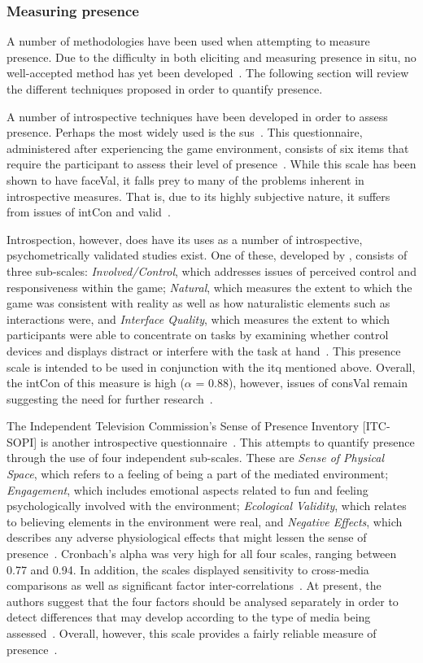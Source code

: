 \subsubsection{Measuring presence}
A number of methodologies have been used when attempting to measure presence. Due to the difficulty in both eliciting and measuring presence in situ, no well-accepted method has yet been developed~\citep{Mand06}. The following section will review the different techniques proposed in order to quantify presence.

A number of introspective techniques have been developed in order to assess presence. Perhaps the most widely used is the \gls{sus}~\citep{Blak10}. This questionnaire, administered after experiencing the game environment, consists of six items that require the participant to assess their level of presence~\citep{Ivor07}. While this scale has been shown to have \gls{faceVal}, it falls prey to many of the problems inherent in introspective measures. That is, due to its highly subjective nature, it suffers from issues of \gls{intCon} and \gls{valid}~\citep{Blak10}.

Introspection, however, does have its uses as a number of introspective, psychometrically validated studies exist. One of these, developed by \citet{Witm98}, consists of three sub-scales: \textit{Involved/Control}, which addresses issues of perceived control and responsiveness within the game; \textit{Natural}, which measures the extent to which the game was consistent with reality as well as how naturalistic elements such as interactions were, and \textit{Interface Quality}, which measures the extent to which participants were able to concentrate on tasks by examining whether control devices and displays distract or interfere with the task at hand~\citep{Witm98}. This presence scale is intended to be used in conjunction with the \gls{itq} mentioned above. Overall, the \gls{intCon} of this measure is high ($\alpha$ = 0.88), however, issues of \gls{consVal} remain suggesting the need for further research~\citep{Witm98}.

The Independent Television Commission's Sense of Presence Inventory [ITC-SOPI] is another introspective questionnaire~\citep{Blak10}. This attempts to quantify presence through the use of four independent sub-scales. These are \textit{Sense of Physical Space}, which refers to a feeling of being a part of the mediated environment; \textit{Engagement}, which includes emotional aspects related to fun and feeling psychologically involved with the environment; \textit{Ecological Validity}, which relates to believing elements in the environment were real, and \textit{Negative Effects}, which describes any adverse physiological effects that might lessen the sense of presence~\citep{Less01}. Cronbach's alpha was very high for all four scales, ranging between 0.77 and 0.94. In addition, the scales displayed sensitivity to cross-media comparisons as well as significant factor inter-correlations~\citep{Less01}. At present, the authors suggest that the four factors should be analysed separately in order to detect differences that may develop according to the type of media being assessed~\citep{Less01}. Overall, however, this scale provides a fairly reliable measure of presence~\citep{Blak10}.


